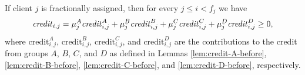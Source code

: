 \begin{lemma}\label{lem:credit-fractional-before}
    If client $j$ is fractionally assigned, then for every $j \leq i < f_j$ we have
    \begin{equation*}
        \text{\emph{credit}}_{i,j} = 
        \mu_j^A\text{\emph{credit}}_{i,j}^A +
        \mu_j^B\text{\emph{credit}}_{i,j}^B +
        \mu_j^C\text{\emph{credit}}_{i,j}^C +
        \mu_j^D\text{\emph{credit}}_{i,j}^D \ge 0,
    \end{equation*}
    where $\text{credit}_{i,j}^A$, $\text{credit}_{i,j}^B$, $\text{credit}_{i,j}^C$, and $\text{credit}_{i,j}^D$ are the contributions to the credit from groups $A$, $B$, $C$, and $D$ as defined in Lemmas \ref{lem:credit-A-before}, \ref{lem:credit-B-before}, \ref{lem:credit-C-before}, and \ref{lem:credit-D-before}, respectively.
\end{lemma}

